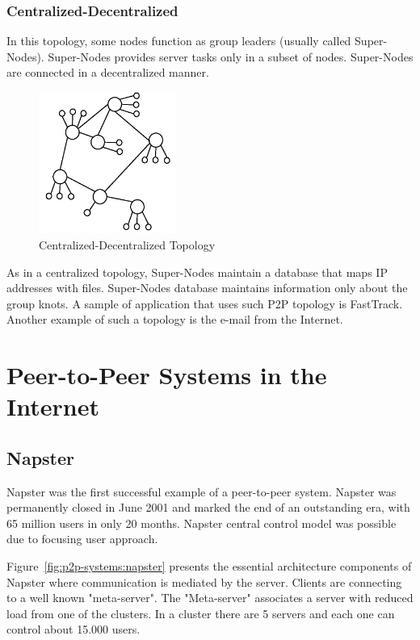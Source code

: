 \subsubsection{Centralized-Decentralized}

In this topology, some nodes function as group leaders (usually called
Super-Nodes). Super-Nodes provides server tasks only in a subset of nodes.
Super-Nodes are connected in a decentralized manner.

\begin{figure}
  \centering
  \includegraphics[width=0.4\textwidth]{src/img/p2p-systems/centralized-decentralized}
  \caption{Centralized-Decentralized Topology}
  \label{fig:p2p-systems:centralized-decentralized}
\end{figure}

As in a centralized topology, Super-Nodes maintain a database that maps IP
addresses with files. Super-Nodes database maintains information only about
the group knots. A sample of application that uses such P2P topology is
FastTrack. Another example of such a topology is the e-mail from the Internet.

\section{Peer-to-Peer Systems in the Internet}
\label{sec:p2p-systems:p2p-internet}

\subsection{Napster}

Napster was the first successful example of a peer-to-peer system. Napster was
permanently closed in June 2001 and marked the end of an outstanding era, with
65 million users in only 20 months. Napster  central control model was possible
due to focusing user approach.

Figure~\ref{fig:p2p-systems:napster} presents the essential architecture
components of Napster where communication is mediated by the server. Clients
are connecting to a well known "meta-server". The "Meta-server" associates a
server with reduced load from one of the clusters. In a cluster there are 5
servers and each one can control about 15.000 users.


